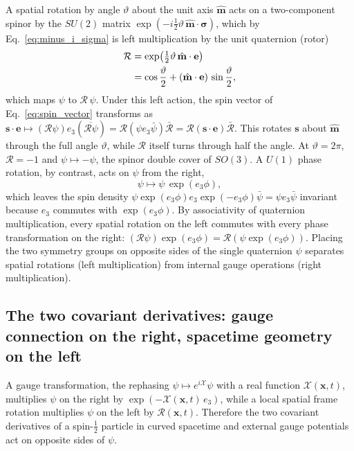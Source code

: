\documentclass[aps,prd,onecolumn,tightenlines,nofootinbib,notitlepage,11pt,floatfix]{revtex4-2}
\theoremstyle{indentedtheorem}
\begin{document}
A spatial rotation by angle $\vartheta$ about the unit axis $\hat{\mathbf{m}}$ acts on a two-component spinor by the $SU(2)$ matrix $\exp(-i\tfrac{1}{2}\vartheta\,\hat{\mathbf{m}}\cdot\boldsymbol{\sigma})$, which by Eq.~\eqref{eq:minus_i_sigma} is left multiplication by the unit quaternion (rotor)
\begin{align}
    \mathcal{R} &= \exp\!\big(\tfrac{1}{2}\vartheta\,\hat{\mathbf{m}}\cdot\mathbf{e}\big) \notag\\
    &= \cos\frac{\vartheta}{2} + (\hat{\mathbf{m}}\cdot\mathbf{e})\,\sin\frac{\vartheta}{2} ,
    \label{eq:left_rotation}
\end{align}
which maps $\psi$ to $\mathcal{R}\,\psi$.
Under this left action, the spin vector of Eq.~\eqref{eq:spin_vector} transforms as $\mathbf{s}\cdot\mathbf{e} \mapsto (\mathcal{R}\psi)e_3(\overline{\mathcal{R}\psi}) = \mathcal{R}(\psi e_3\bar{\psi})\bar{\mathcal{R}} = \mathcal{R}(\mathbf{s}\cdot\mathbf{e})\bar{\mathcal{R}}$. This rotates $\mathbf{s}$ about $\hat{\mathbf{m}}$ through the full angle $\vartheta$, while $\mathcal{R}$ itself turns through half the angle. At $\vartheta=2\pi$, $\mathcal{R}=-1$ and $\psi\mapsto-\psi$, the spinor double cover of $SO(3)$. A $U(1)$ phase rotation, by contrast, acts on $\psi$ from the right,
\begin{equation}
    \psi \mapsto \psi\,\exp(e_3\phi) ,
    \label{eq:right_phase}
\end{equation}
which leaves the spin density $\psi\exp(e_3\phi)e_3\exp(-e_3\phi)\bar{\psi} = \psi e_3\bar{\psi}$ invariant because $e_3$ commutes with $\exp(e_3\phi)$. By associativity of quaternion multiplication, every spatial rotation on the left commutes with every phase transformation on the right: $(\mathcal{R}\psi)\exp(e_3\phi) = \mathcal{R}(\psi\exp(e_3\phi))$. Placing the two symmetry groups on opposite sides of the single quaternion $\psi$ separates spatial rotations (left multiplication) from internal gauge operations (right multiplication).

\subsection{The two covariant derivatives: gauge connection on the right, spacetime geometry on the left}
\label{sec:connections}

A gauge transformation, the rephasing $\psi\mapsto e^{i\mathcal{X}}\psi$ with a real function $\mathcal{X}(\mathbf{x},t)$, multiplies $\psi$ on the right by $\exp(-\mathcal{X}(\mathbf{x},t)\,e_3)$, while a local spatial frame rotation multiplies $\psi$ on the left by $\mathcal{R}(\mathbf{x},t)$. Therefore the two covariant derivatives of a spin-$\tfrac{1}{2}$ particle in curved spacetime and external gauge potentials act on opposite sides of $\psi$.
\end{document}
